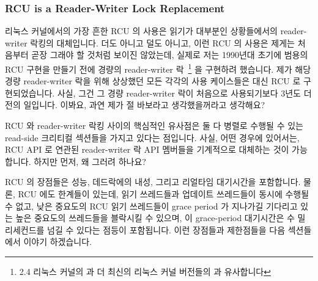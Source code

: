 \subsubsection{RCU is a Reader-Writer Lock Replacement}
\label{sec:defer:RCU is a Reader-Writer Lock Replacement}

리눅스 커널에서의 가장 흔한 RCU 의 사용은 읽기가 대부분인 상황들에서의
reader-writer 락킹의 대체입니다.
더도 아니고 덜도 아니고, 이런 RCU 의 사용은 제게는 처음부터 곧장 그래야 할
것처럼 보이진 않았는데, 실제로 저는 1990년대 초기에 범용의 RCU 구현을 만들기
전에 경량의 reader-writer 락~\cite{WilsonCHsieh92a}\footnote{
	2.4 리눅스 커널의  과 더 최신의 리눅스 커널 버전들의
	 과 유사합니다}
을 구현하려 했습니다.
제가 해당 경량 reader-writer 락을 위해 상상했던 모든 각각의 사용 케이스들은
대신 RCU 로 구현되었습니다.
사실, 그건 그 경량 reader-writer 락이 처음으로 사용되기보다 3년도 더 전의
일입니다.
이봐요, 과연 제가 절 바보라고 생각했을꺼라고 생각해요?

RCU 와 reader-writer 락킹 사이의 핵심적인 유사점은 둘 다 병렬로 수행될 수 있는
read-side 크리티컬 섹션들을 가지고 있다는 점입니다.
사실, 어떤 경우에 있어서는, RCU API 로 연관된 reader-writer 락 API 멤버들을
기계적으로 대체하는 것이 가능합니다.
하지만 먼저, 왜 그러려 하나요?

RCU 의 장점들은 성능, 데드락에의 내성, 그리고 리얼타임 대기시간을 포함합니다.
물론, RCU 에도 한계들이 있는데, 읽기 쓰레드들과 업데이트 쓰레드들이 동시에
수행될 수 없고, 낮은 중요도의 RCU 읽기 쓰레드들이 grace period 가 지나가길
기다리고 있는 높은 중요도의 쓰레드들을 블락시킬 수 있으며, 이 grace-period
대기시간은 수 밀리세컨드를 넘길 수 있다는 점등이 포함됩니다.
이런 장점들과 제한점들을 다음 섹션들에서 이야기 하겠습니다.
\iffalse

